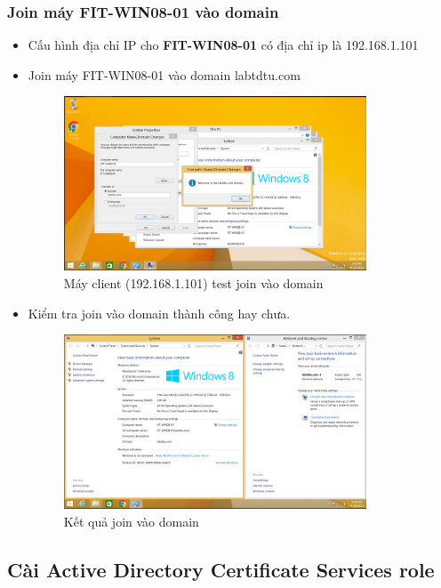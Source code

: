 \documentclass[13pt]{report}
\begin{document}
	\subsubsection{Join máy FIT-WIN08-01 vào domain}
	\begin{itemize}
		\item Cấu hình địa chỉ IP cho \textbf{FIT-WIN08-01} có địa chỉ ip là 192.168.1.101
		\item Join máy FIT-WIN08-01 vào domain labtdtu.com
		\begin{figure}[htp]
			\centering
			\includegraphics[width=0.85\textwidth]{image/PowerShell/FIT-WIN08-01/1.png}
			\caption{Máy client (192.168.1.101) test join vào domain}
		\end{figure}
		\newpage
		\item Kiểm tra join vào domain thành công hay chưa.
		\begin{figure}[htp]
			\centering
			\includegraphics[width=0.85\textwidth]{image/PowerShell/FIT-WIN08-01/2.png}
			\caption{Kết quả join vào domain}
		\end{figure}
	\end{itemize}
	\subsection{Cài Active Directory Certificate Services role}
\end{document}
